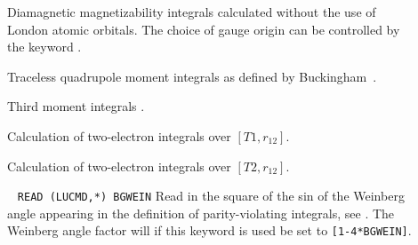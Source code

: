 \begin{description}
\item[] Diamagnetic magnetizability integrals calculated
without the use of London atomic orbitals. The choice of gauge
origin
can be controlled by the keyword .


\item[] Traceless quadrupole moment integrals as defined by Buckingham~\cite{adbacp12}.


\item[] Third moment integrals
.


\item[] Calculation of two-electron integrals over
  $\left[T1,r_{12}\right]$.

\item[] Calculation of two-electron integrals over
  $\left[T2,r_{12}\right]$.

\item[]\verb| |\newline
\verb|READ (LUCMD,*) BGWEIN|\newline
Read in the square of the sin of the Weinberg angle appearing in the
definition of parity-violating integrals, see . The
Weinberg angle factor will if this keyword is used be set to
\verb|[1-4*BGWEIN]|. 


\end{description}
